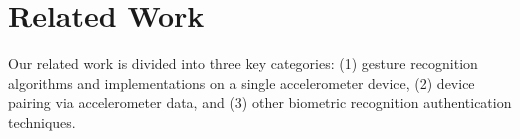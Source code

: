 
\section{Related Work}
\label{sec:RelatedWork}

Our related work is divided into three key categories: (1) gesture recognition algorithms and implementations on a single accelerometer device, (2) device pairing via accelerometer data, and (3) other biometric recognition authentication techniques.





